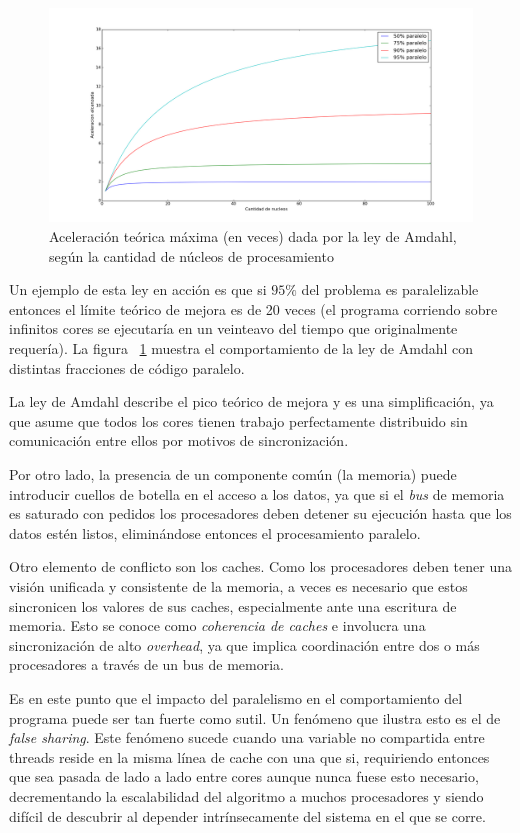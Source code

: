 \begin{figure}[htbp]
    \centering
    \includegraphics[width=\plotwidth]{images/amdahl.png}
    \caption{Aceleraci\'on te\'orica m\'axima (en veces) dada por la ley de Amdahl, seg\'un la cantidad de n\'ucleos de procesamiento}
    \label{fig:amdahl_plot}
\end{figure}

Un ejemplo de esta ley en acci\'on es que si $95 \%$ del problema es paralelizable entonces el l\'imite te\'orico de
mejora es de 20 veces (el programa corriendo sobre infinitos cores se ejecutar\'ia en un veinteavo del tiempo que originalmente
requer\'ia). La figura ~\ref{fig:amdahl_plot} muestra el comportamiento de la ley de Amdahl con distintas fracciones de c\'odigo
paralelo.

La ley de Amdahl describe el pico te\'orico de mejora y es una simplificaci\'on, ya que asume que todos los cores tienen
trabajo perfectamente distribuido sin comunicaci\'on entre ellos por motivos de sincronizaci\'on.

Por otro lado, la presencia de un componente com\'un (la memoria) puede introducir cuellos de botella en el acceso a los
datos, ya que si el \textit{bus} de memoria es saturado con pedidos los procesadores deben detener su ejecuci\'on hasta que
los datos est\'en listos, elimin\'andose entonces el procesamiento paralelo.

Otro elemento de conflicto son los caches. Como los procesadores deben tener una visi\'on unificada y consistente de la
memoria, a veces es necesario que estos sincronicen los valores de sus caches, especialmente ante una escritura de memoria.
Esto se conoce como \textit{coherencia de caches} e involucra una sincronizaci\'on de alto \textit{overhead}, ya
que implica coordinaci\'on entre dos o m\'as procesadores a trav\'es de un bus de memoria.

Es en este punto que el impacto del paralelismo en el comportamiento del programa puede ser tan fuerte como sutil. Un fen\'omeno que
ilustra esto es el de \textit{false sharing}. Este fen\'omeno sucede cuando una variable no compartida entre threads
reside en la misma l\'inea de cache con una que si, requiriendo entonces que sea pasada de lado a lado entre cores aunque
nunca fuese esto necesario, decrementando la escalabilidad del algoritmo a muchos procesadores y siendo
dif\'icil de descubrir al depender intr\'insecamente del sistema en el que se corre.
